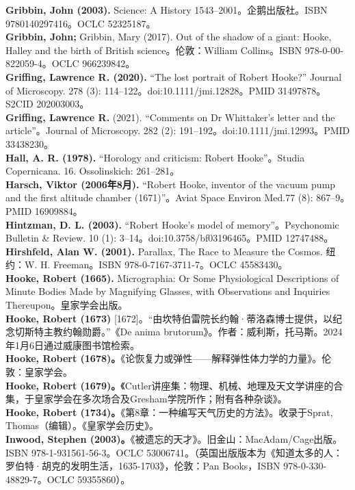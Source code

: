 \textbf{ Gribbin, John (2003). }Science: A History 1543–2001。企鹅出版社。ISBN 9780140297416。OCLC 52325187。\\
\textbf{Gribbin, John;} Gribbin, Mary (2017). Out of the shadow of a giant: Hooke, Halley and the birth of British science。伦敦：William Collins。ISBN 978-0-00-822059-4。OCLC 966239842。\\
\textbf{Griffing, Lawrence R. (2020).} “The lost portrait of Robert Hooke?” Journal of Microscopy. 278 (3): 114–122。doi:10.1111/jmi.12828。PMID 31497878。S2CID 202003003。\\
\textbf{Griffing, Lawrence R.} (2021). “Comments on Dr Whittaker's letter and the article”。Journal of Microscopy. 282 (2): 191–192。doi:10.1111/jmi.12993。PMID 33438230。\\
\textbf{Hall, A. R. (1978). }“Horology and criticism: Robert Hooke”。Studia Copernicana. 16. Ossolinskich: 261–281。\\
\textbf{Harsch, Viktor (2006年8月).} “Robert Hooke, inventor of the vacuum pump and the first altitude chamber (1671)”。Aviat Space Environ Med.77 (8): 867–9。PMID 16909884。\\
\textbf{Hintzman, D. L. (2003).} “Robert Hooke's model of memory”。Psychonomic Bulletin & Review. 10 (1): 3–14。doi:10.3758/bf03196465。PMID 12747488。  
\textbf{Hirshfeld, Alan W. (2001).} Parallax, The Race to Measure the Cosmos. 纽约：W. H. Freeman。ISBN 978-0-7167-3711-7。OCLC 45583430。\\
\textbf{Hooke, Robert (1665).} Micrographia: Or Some Physiological Descriptions of Minute Bodies Made by Magnifying Glasses, with Observations and Inquiries Thereupon。皇家学会出版。\\
\textbf{Hooke, Robert (1673)} [1672]。“由坎特伯雷院长约翰·蒂洛森博士提供，以纪念切斯特主教约翰勋爵。”《De anima brutorum》。作者：威利斯，托马斯。2024年1月6日通过威康图书馆检索。\\
\textbf{Hooke, Robert (1678)。}《论恢复力或弹性——解释弹性体力学的力量》。伦敦：皇家学会。\\
\textbf{Hooke, Robert (1679)。}《Cutler讲座集：物理、机械、地理及天文学讲座的合集，于皇家学会在多次场合及Gresham学院所作；附有各种杂谈》。\\
\textbf{Hooke, Robert (1734)。}《第8章：一种编写天气历史的方法》。收录于Sprat, Thomas（编辑）。《皇家学会历史》。\\
\textbf{Inwood, Stephen (2003)。}《被遗忘的天才》。旧金山：MacAdam/Cage出版。ISBN 978-1-931561-56-3。OCLC 53006741。（英国出版版本为《知道太多的人：罗伯特·胡克的发明生活，1635-1703》，伦敦：Pan Books，ISBN 978-0-330-48829-7。OCLC 59355860）。\\
